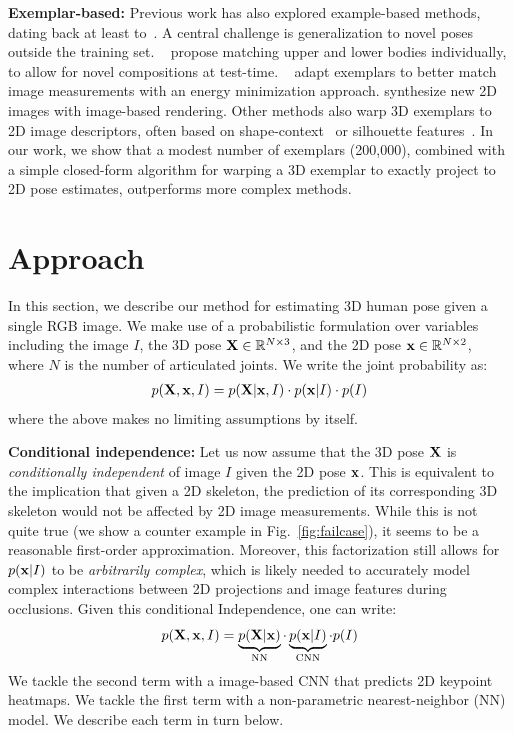 \documentclass[10pt,twocolumn,letterpaper]{article}
\begin{document}
\textbf{Exemplar-based:} Previous work has also explored example-based methods, dating back at least to~\cite{shakhnarovich2003fast}. A central challenge is generalization to novel poses outside the training set. ~\cite{jiang20103d} propose matching upper and lower bodies individually, to allow for novel compositions at test-time. ~\cite{Yasin_2016_CVPR} adapt exemplars to better match image measurements with an energy minimization approach. \cite{rogez2016mocap} synthesize new 2D images with image-based rendering. Other methods also warp 3D exemplars to 2D image descriptors, often based on shape-context~\cite{agarwal20043d,mori2006recovering} or silhouette features~\cite{IonescuSminchisescu11}.
In our work, we show that a modest number of exemplars (200,000), combined with a simple closed-form algorithm for warping a 3D exemplar to exactly project to 2D pose estimates, outperforms more complex methods.






\section{Approach}
In this section, we describe our method for estimating 3D human pose given a single RGB image. We make use of a probabilistic formulation over variables including the image $I$, the 3D pose ${\bf X} \in \mathbb{R}^{N\times3}$, and the 2D pose ${\bf x}\in \mathbb{R}^{N\times2}$, where  $N$ is the number of articulated joints. We write the joint probability as:
\begin{align}
    {p({\bf X}, {\bf x}, I) = p({\bf X}|{\bf x}, I) \cdot p({\bf x}|I)\cdot p(I)}\label{eq:standard_p}
\end{align}
\noindent where the above makes no limiting assumptions by itself.

{\bf Conditional independence:} Let us now assume that the 3D pose ${\bf X}$ is {\em conditionally independent} of image $I$ given the 2D pose ${\bf x}$. This is equivalent to the implication that given a 2D skeleton, the prediction of its corresponding 3D skeleton would not be affected by 2D image measurements. While this is not quite true (we show a counter example in Fig.~\ref{fig:failcase}), it seems to be a reasonable first-order approximation. Moreover, this factorization still allows for $p({\bf x}|I)$ to be {\em arbitrarily complex},  which is likely needed to accurately model complex interactions between 2D projections and image features during occlusions. Given this conditional Independence, one can write:
\begin{align}
    p({\bf X}, {\bf x}, I) = \underbrace{p({\bf X}|{\bf x})}_{\text{NN}} \cdot \underbrace{p({\bf x}|I)}_{\text{CNN}} \cdot p(I)
\label{eq:conditioned_p}
\end{align}
We tackle the second term with a image-based CNN that predicts 2D keypoint heatmaps. We tackle the first term with a non-parametric nearest-neighbor (NN) model. We describe each term in turn below.
\end{document}

